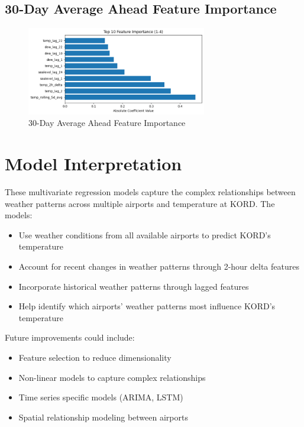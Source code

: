 \subsection{30-Day Average Ahead Feature Importance}
\begin{figure}[htbp]
\centering
\includegraphics[width=0.7\textwidth]{1-4-linear_temp_shift_feature_importance.png}
\caption{30-Day Average Ahead Feature Importance}
\label{fig:30-day_average_ahead_featimp}
\end{figure}


\section{Model Interpretation}

These multivariate regression models capture the complex relationships between weather patterns across multiple airports and temperature at KORD. The models:\\
\begin{itemize}
  \item Use weather conditions from all available airports to predict KORD's temperature
  \item Account for recent changes in weather patterns through 2-hour delta features
  \item Incorporate historical weather patterns through lagged features
  \item Help identify which airports' weather patterns most influence KORD's temperature
\end{itemize}
Future improvements could include:\\
\begin{itemize}
  \item Feature selection to reduce dimensionality
  \item Non-linear models to capture complex relationships
  \item Time series specific models (ARIMA, LSTM)
  \item Spatial relationship modeling between airports
\end{itemize}

